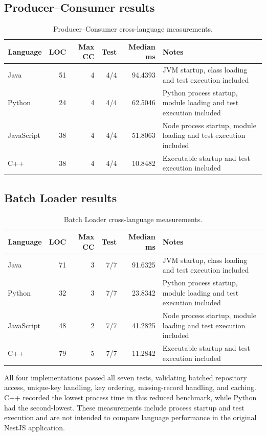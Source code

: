 \documentclass[11pt,a4paper]{article}
\begin{document}
\subsection{Producer--Consumer results}
\begin{table}[H]
\centering\small
\begin{tabularx}{\linewidth}{@{}lrrrrY@{}}
\toprule
Language & LOC & Max CC & Test & Median ms & Notes\\
\midrule
Java & 51 & 4 & 4/4 & 94.4393 & JVM startup, class loading and test execution included\\
Python & 24 & 4 & 4/4 & 62.5046 & Python process startup, module loading and test execution included\\
JavaScript & 38 & 4 & 4/4 & 51.8063 & Node process startup, module loading and test execution included\\
C++ & 38 & 4 & 4/4 & 10.8482 & Executable startup and test execution included\\
\bottomrule
\end{tabularx}
\caption{Producer--Consumer cross-language measurements.}
\end{table}

\subsection{Batch Loader results}
\begin{table}[H]
\centering\small
\begin{tabularx}{\linewidth}{@{}lrrrrY@{}}
\toprule
Language & LOC & Max CC & Test & Median ms & Notes\\
\midrule
Java & 71 & 3 & 7/7 & 91.6325 & JVM startup, class loading and test execution included\\
Python & 32 & 3 & 7/7 & 23.8342 & Python process startup, module loading and test execution included\\
JavaScript & 48 & 2 & 7/7 & 41.2825 & Node process startup, module loading and test execution included\\
C++ & 79 & 5 & 7/7 & 11.2842 & Executable startup and test execution included\\
\bottomrule
\end{tabularx}
\caption{Batch Loader cross-language measurements.}
\end{table}


All four implementations passed all seven tests, validating batched repository access, unique-key handling, key ordering, missing-record handling, and caching. C++ recorded the lowest process time in this reduced benchmark, while Python had the second-lowest. These measurements include process startup and test execution and are not intended to compare language performance in the original NestJS application.
\end{document}
